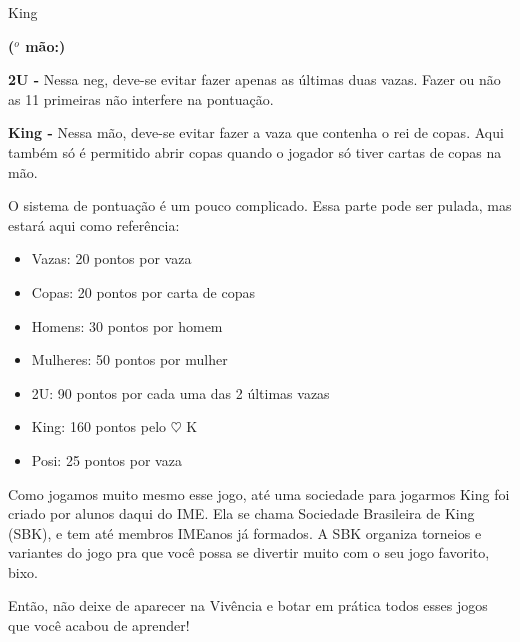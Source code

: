 \begin{subsecao}{King}
\begin{list}{\textbf{ ($^{o}$ mão:)}}{}
\item \textbf{2U -} Nessa neg, deve-se evitar fazer apenas as últimas duas
vazas. Fazer ou não as 11 primeiras não interfere na pontuação.

\item \textbf{King -} Nessa mão, deve-se evitar fazer a vaza que contenha o rei
de copas. Aqui também só é permitido abrir copas quando o jogador só tiver
cartas de copas na mão.

\end{list}

O sistema de pontuação é um pouco complicado. Essa parte pode ser pulada, mas
estará aqui como referência:
\begin{itemize}

\item Vazas:	  20 pontos por vaza
\item Copas:	  20 pontos por carta de copas
\item Homens:	  30 pontos por homem
\item Mulheres: 50 pontos por mulher
\item 2U:	  90 pontos por cada uma das 2 últimas vazas
\item King:    160 pontos pelo $\heartsuit$ K
\item Posi:	  25 pontos por vaza

\end{itemize}
Como jogamos muito mesmo esse jogo, até uma sociedade para jogarmos King foi
criado por alunos daqui do IME. Ela se chama Sociedade Brasileira de
King (SBK), e tem até membros IMEanos já formados. A SBK organiza torneios e
variantes do jogo pra que você possa se divertir muito com o seu jogo favorito, bixo.

Então, não deixe de aparecer na Vivência e botar em prática todos esses jogos
que você acabou de aprender!

\end{subsecao}
